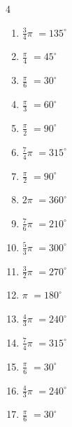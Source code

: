 \begin{multicols}{4}
\begin{enumerate}
  \item $\displaystyle \frac{3}{4}\pi$
        $\displaystyle =135^{\circ}$

  \item $\displaystyle \frac{\pi}{4}$
        $\displaystyle =45^{\circ}$

  \item $\displaystyle \frac{\pi}{6}$
        $\displaystyle =30^{\circ}$

  \item $\displaystyle \frac{\pi}{3}$
        $\displaystyle =60^{\circ}$

  \item $\displaystyle \frac{\pi}{2}$
        $\displaystyle =90^{\circ}$

\columnbreak %

  \item $\displaystyle \frac{7}{4}\pi$
        $\displaystyle =315^{\circ}$

  \item $\displaystyle \frac{\pi}{2}$
        $\displaystyle =90^{\circ}$

  \item $\displaystyle 2\pi$
        $\displaystyle =360^{\circ}$

  \item $\displaystyle \frac{7}{6}\pi$
        $\displaystyle =210^{\circ}$

  \item $\displaystyle \frac{5}{3}\pi$
        $\displaystyle =300^{\circ}$

  \item $\displaystyle \frac{3}{2}\pi$
        $\displaystyle =270^{\circ}$

  \item $\displaystyle \pi$
        $\displaystyle =180^{\circ}$

  \item $\displaystyle \frac{4}{3}\pi$
        $\displaystyle =240^{\circ}$

  \item $\displaystyle \frac{7}{4}\pi$
        $\displaystyle =315^{\circ}$

  \item $\displaystyle \frac{\pi}{6}$
        $\displaystyle =30^{\circ}$

  \item $\displaystyle \frac{4}{3}\pi$
        $\displaystyle =240^{\circ}$

  \item $\displaystyle \frac{\pi}{6}$
        $\displaystyle =30^{\circ}$


\end{enumerate}
\end{multicols}
